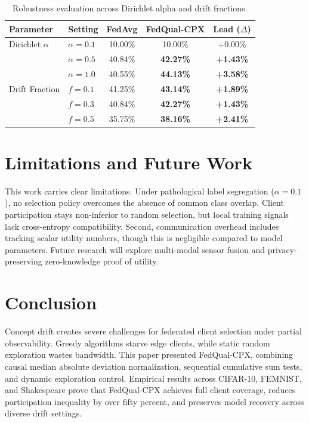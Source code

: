 \documentclass[conference]{IEEEtran}
\begin{document}
\begin{table}[h]
\caption{Robustness evaluation across Dirichlet alpha and drift fractions.}
\label{tab:robustness}
\centering
\begin{tabular}{llccc}
\toprule
\textbf{Parameter} & \textbf{Setting} & \textbf{FedAvg} & \textbf{FedQual-CPX} & \textbf{Lead ($\Delta$)} \\
\midrule
Dirichlet $\alpha$ & $\alpha = 0.1$ & 10.00\% & 10.00\% & +0.00\% \\
& $\alpha = 0.5$ & 40.84\% & \textbf{42.27\%} & \textbf{+1.43\%} \\
& $\alpha = 1.0$ & 40.55\% & \textbf{44.13\%} & \textbf{+3.58\%} \\
\midrule
Drift Fraction & $f = 0.1$ & 41.25\% & \textbf{43.14\%} & \textbf{+1.89\%} \\
& $f = 0.3$ & 40.84\% & \textbf{42.27\%} & \textbf{+1.43\%} \\
& $f = 0.5$ & 35.75\% & \textbf{38.16\%} & \textbf{+2.41\%} \\
\bottomrule
\end{tabular}
\end{table}

\section{Limitations and Future Work}
This work carries clear limitations. Under pathological label segregation ($\alpha = 0.1$), no selection policy overcomes the absence of common class overlap. Client participation stays non-inferior to random selection, but local training signals lack cross-entropy compatibility. Second, communication overhead includes tracking scalar utility numbers, though this is negligible compared to model parameters. Future research will explore multi-modal sensor fusion and privacy-preserving zero-knowledge proof of utility.

\section{Conclusion}
Concept drift creates severe challenges for federated client selection under partial observability. Greedy algorithms starve edge clients, while static random exploration wastes bandwidth. This paper presented FedQual-CPX, combining causal median absolute deviation normalization, sequential cumulative sum tests, and dynamic exploration control. Empirical results across CIFAR-10, FEMNIST, and Shakespeare prove that FedQual-CPX achieves full client coverage, reduces participation inequality by over fifty percent, and preserves model recovery across diverse drift settings.
\end{document}
